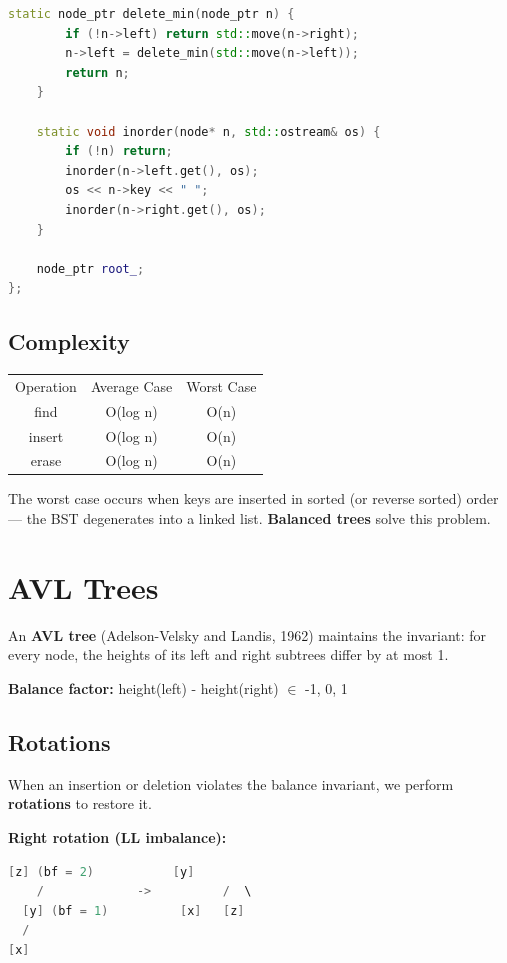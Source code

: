 \begin{lstlisting}[language=C++]
    static node_ptr delete_min(node_ptr n) {
        if (!n->left) return std::move(n->right);
        n->left = delete_min(std::move(n->left));
        return n;
    }

    static void inorder(node* n, std::ostream& os) {
        if (!n) return;
        inorder(n->left.get(), os);
        os << n->key << " ";
        inorder(n->right.get(), os);
    }

    node_ptr root_;
};
\end{lstlisting}

\subsection{Complexity}

\begin{center}
\begin{tabular}{ccc}
\toprule
Operation & Average Case & Worst Case \\
find & O(log n) & O(n) \\
insert & O(log n) & O(n) \\
erase & O(log n) & O(n) \\

\bottomrule
\end{tabular}
\end{center}
The worst case occurs when keys are inserted in sorted (or reverse sorted) order — the BST degenerates into a linked list. \textbf{Balanced trees} solve this problem.

\section{AVL Trees}

An \textbf{AVL tree} (Adelson-Velsky and Landis, 1962) maintains the invariant: for every node, the heights of its left and right subtrees differ by at most 1.

\textbf{Balance factor:} height(left) - height(right) $\in $ {-1, 0, 1}

\subsection{Rotations}

When an insertion or deletion violates the balance invariant, we perform \textbf{rotations} to restore it.

\textbf{Right rotation (LL imbalance):}

\begin{lstlisting}[language=Java]
    [z] (bf = 2)           [y]
    /             ->          /  \
  [y] (bf = 1)          [x]   [z]
  /
[x]
\end{lstlisting}

